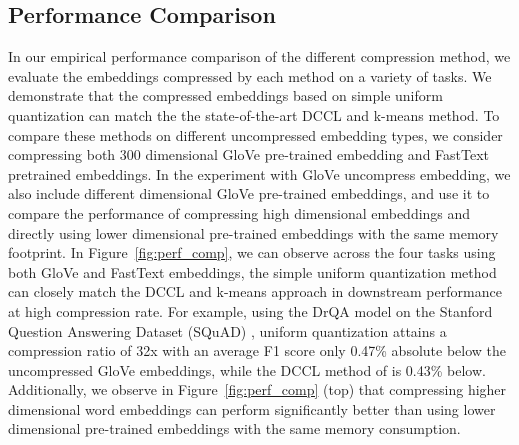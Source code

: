 \subsection{Performance Comparison}
\label{sec:perf_comp}
 In our empirical performance comparison of the different compression method, we evaluate the embeddings compressed by each method on a variety of tasks. We demonstrate that the compressed embeddings based on simple uniform quantization can match the the state-of-the-art DCCL and k-means method. To compare these methods on different uncompressed embedding types, we consider compressing both 300 dimensional GloVe pre-trained embedding and  FastText pretrained embeddings. In the experiment with GloVe uncompress embedding, we also include different dimensional GloVe pre-trained embeddings, and use it to compare the performance of compressing high dimensional embeddings and directly using lower dimensional pre-trained embeddings with the same memory footprint. In Figure~\ref{fig:perf_comp}, we can observe across the four tasks using both GloVe and FastText embeddings, the simple uniform quantization method can closely match the DCCL and k-means approach in downstream performance at high compression rate. For example, using the DrQA model \citep{drqa17} on the Stanford Question Answering Dataset (SQuAD) \citep{squad16}, uniform quantization attains a compression ratio of 32x with an average F1 score only 0.47\% absolute below the uncompressed GloVe embeddings, while the DCCL method of \citet{dccl17} is 0.43\% below. Additionally, we observe in Figure~\ref{fig:perf_comp} (top) that compressing higher dimensional word embeddings can perform significantly better than using lower dimensional pre-trained embeddings with the same memory consumption.

